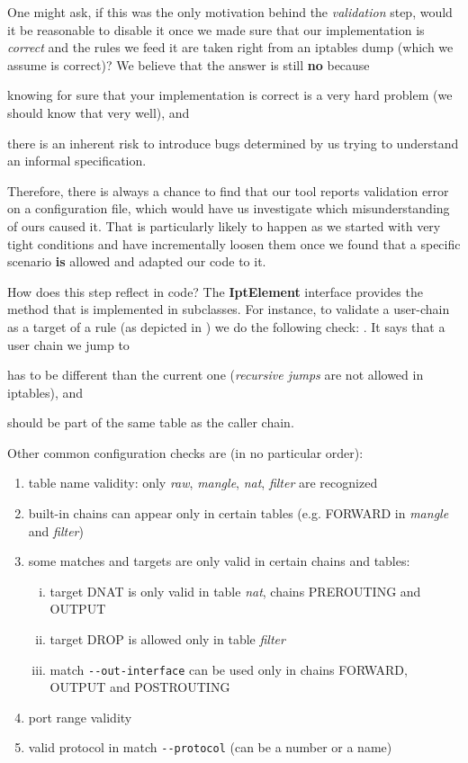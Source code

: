 One might ask, if this was the only motivation behind the \emph{validation}
step, would it be reasonable to disable it once we made sure that our
implementation is \emph{correct} and the rules we feed it are taken right from
an iptables dump (which we assume is correct)?  We believe that the answer is
still \textbf{no} because
\begin{enumerate*}[(i)]
  \item knowing for sure that your implementation is correct is a very hard
    problem (we should know that very well), and
  \item there is an inherent risk to introduce bugs determined by us trying to
    understand an informal specification.
\end{enumerate*}
Therefore, there is always a chance to find that our tool reports validation
error on a configuration file, which would have us investigate which
misunderstanding of ours caused it.  That is particularly likely to happen as
we started with very tight conditions and have incrementally loosen them once
we found that a specific scenario \textbf{is} allowed and adapted our code to
it.

How does this step reflect in code?  The \textbf{IptElement} interface provides
the method  that is
implemented in subclasses.  For instance, to validate a user-chain as a target
of a rule (as depicted in ) we do the
following check: .  It
says that a user chain we jump to
\begin{enumerate*}[(i)]
  \item has to be different than the current one (\emph{recursive jumps} are
    not allowed in iptables), and
  \item should be part of the same table as the caller chain.
\end{enumerate*}

Other common configuration checks are (in no particular order):
\begin{enumerate}
  \item table name validity: only \emph{raw}, \emph{mangle}, \emph{nat},
    \emph{filter} are recognized
  \item built-in chains can appear only in certain tables (e.g. FORWARD in
    \emph{mangle} and \emph{filter})
  \item some matches and targets are only valid in certain chains and tables:
    \begin{enumerate}[(i)]
      \item target DNAT is only valid in table \emph{nat}, chains PREROUTING
        and OUTPUT
      \item target DROP is allowed only in table \emph{filter}
      \item match \lstinline{--out-interface} can be used only in chains
        FORWARD, OUTPUT and POSTROUTING
    \end{enumerate}
  \item port range validity
  \item valid protocol in match \lstinline{--protocol} (can be a number or a
    name)
\end{enumerate}

